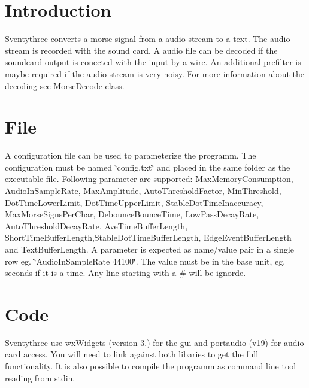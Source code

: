 \hypertarget{index_Introduction}{}\section{Introduction}\label{index_Introduction}
Sventythree converts a morse signal from a audio stream to a text. The audio stream is recorded with the sound card. A audio file can be decoded if the soundcard output is conected with the input by a wire. An additional prefilter is maybe required if the audio stream is very noisy. For more information about the decoding see \hyperlink{classMorseDecode}{Morse\+Decode} class.\hypertarget{index_Configuration}{}\section{File}\label{index_Configuration}
A configuration file can be used to parameterize the programm. The configuration must be named \char`\"{}config.\+txt\char`\"{} and placed in the same folder as the executable file. Following parameter are supported\+: Max\+Memory\+Consumption, Audio\+In\+Sample\+Rate, Max\+Amplitude, Auto\+Threshold\+Factor, Min\+Threshold, Dot\+Time\+Lower\+Limit, Dot\+Time\+Upper\+Limit, Stable\+Dot\+Time\+Inaccuracy, Max\+Morse\+Signs\+Per\+Char, Debounce\+Bounce\+Time, Low\+Pass\+Decay\+Rate, Auto\+Threshold\+Decay\+Rate, Ave\+Time\+Buffer\+Length, Short\+Time\+Buffer\+Length,Stable\+Dot\+Time\+Buffer\+Length, Edge\+Event\+Buffer\+Length and Text\+Buffer\+Length. A parameter is expected as name/value pair in a single row eg. \char`\"{}\+Audio\+In\+Sample\+Rate 44100\char`\"{}. The value must be in the base unit, eg. seconds if it is a time. Any line starting with a \# will be ignorde.\hypertarget{index_Source}{}\section{Code}\label{index_Source}
Sventythree use wx\+Widgets (version 3.) for the gui and portaudio (v19) for audio card access. You will need to link against both libaries to get the full functionality. It is also possible to compile the programm as command line tool reading from stdin. 